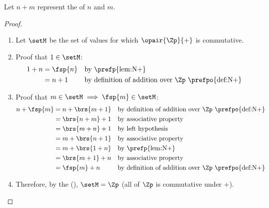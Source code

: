 \begin{theorem}
\label{thm:N+_com}
Let $n+m$ represent the  of $n$ and $m$.
\end{theorem}
\begin{proof}
    \begin{enumerate}
      \item Let $\setM$ be the set of values for which $\opair{\Zp}{+}$ is commutative.
      \item Proof that $1\in\setM$:
        \begin{align*}
          1 + n
            &= \fsp{n}
            && \text{by \prefp{lem:N+}}
          \\&= n+1
            && \text{by definition of addition over $\Zp$ \prefpo{def:N+}}
        \end{align*}

      \item Proof that $m\in\setM\implies\fsp{m}\in\setM$:
        \begin{align*}
          n + \fsp{m}
            &= n + \brs{m+1}
            && \text{by definition of addition over $\Zp$ \prefpo{def:N+}}
          \\&= \brs{n + m}+1
            && \text{by associative property}
          \\&= \brs{m + n}+1
            && \text{by left hypothesis}
          \\&= m + \brs{n+1}
            && \text{by associative property}
          \\&= m + \brs{1+n}
            && \text{by \prefp{lem:N+}}
          \\&= \brs{m + 1} + n
            && \text{by associative property}
          \\&= \fsp{m} + n
            && \text{by definition of addition over $\Zp$ \prefpo{def:N+}}
        \end{align*}

      \item Therefore, by the  (),
            $\setM=\Zp$ (all of $\Zp$ is commutative under $+$).
    \end{enumerate}
\end{proof}


